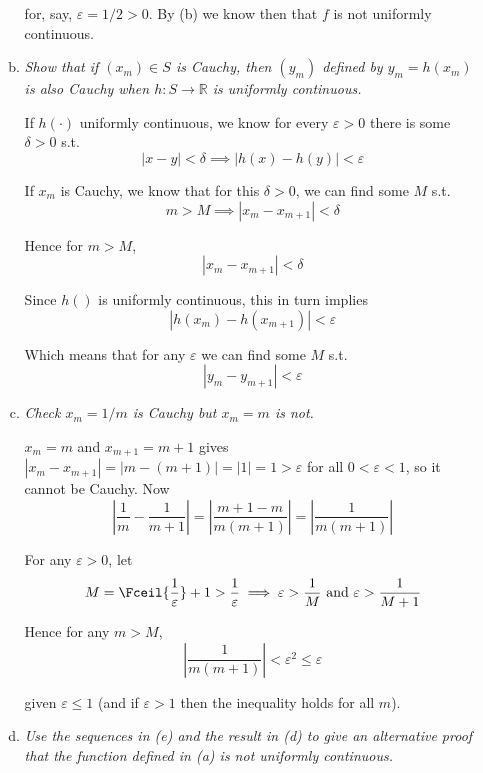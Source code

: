 \documentclass{article}
\begin{document}
\begin{enumerate}[1.]
\begin{enumerate}[a)]
        for, say, $\varepsilon = 1 / 2 > 0$. By (b) we know then that $f$ is not uniformly continuous.

      \item \textit{Show that if $(x_m) \in S$ is Cauchy, then $(y_m)$ defined by $y_m = h(x_m)$ is also Cauchy when $h: S \to \mathbb{R}$ is uniformly continuous.}

        \solution If $h(\cdot)$ uniformly continuous, we know for every $\varepsilon > 0$ there is some $\delta > 0$ s.t.
        \[
          |x - y| < \delta \implies |h(x) - h(y)| < \varepsilon
        \]

        If $x_m$ is Cauchy, we know that for this $\delta > 0$, we can find some $M$ s.t.
        \[
          m > M \implies |x_m - x_{m + 1}| < \delta
        \]

        Hence for $m > M$,
        \[
          |x_m - x_{m + 1}| < \delta
        \]

        Since $h()$ is uniformly continuous, this in turn implies
        \[
          |h(x_m) - h(x_{m + 1})| < \varepsilon
        \]

        Which means that for any $\varepsilon$ we can find some $M$ s.t.
        \[
          |y_m - y_{m + 1}| < \varepsilon
        \]

      \item \textit{Check $x_m = 1 / m$ is Cauchy but $x_m = m$ is not.}

        \solution $x_m = m$ and $x_{m + 1} = m + 1$ gives $|x_m - x_{m + 1}| = |m - (m + 1)| = |1| = 1 > \varepsilon$ for all $0 < \varepsilon < 1$, so it cannot be Cauchy. Now
        \[
          \left|\dfrac{1}{m} - \dfrac{1}{m + 1}\right|
          =
          \left|\dfrac{m + 1 - m}{m (m + 1)}\right|
          =
          \left|\dfrac{1}{m (m + 1)}\right|
        \]

        For any $\varepsilon > 0$, let
        \[
          M = \Fceil{\dfrac{1}{\varepsilon}} + 1 > \dfrac{1}{\varepsilon}
          \implies
          \varepsilon > \dfrac{1}{M}
          \text{ and }
          \varepsilon > \dfrac{1}{M + 1}
        \]

        Hence for any $m > M$,
        \[
          \left|\dfrac{1}{m (m + 1)}\right|
          < \varepsilon^2
          \le \varepsilon
        \]

        given $\varepsilon \le 1$ (and if $\varepsilon > 1$ then the inequality holds for all $m$).

      \item \textit{Use the sequences in (e) and the result in (d) to give an alternative proof that the function defined in (a) is not uniformly continuous.}


\end{enumerate}
\end{enumerate}
\end{document}
